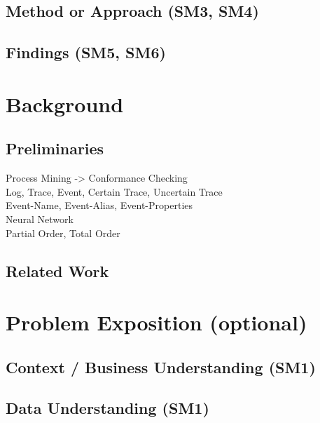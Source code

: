 \documentclass[
	a4paper,
	pagesize,
	pdftex,
	12pt,
	ngerman,
	fleqn,
	final,
	]{scrartcl}
\theoremstyle{definition}
\begin{document}
	\subsection{Method or Approach (SM3, SM4)}\label{sec:introduction::method}
	
	\subsection{Findings (SM5, SM6)}\label{sec:introduction::results}

\section{Background}
	\subsection{Preliminaries}
		Process Mining -> Conformance Checking \\
		Log, Trace, Event, Certain Trace, Uncertain Trace \\
		Event-Name, Event-Alias, Event-Properties \\
		Neural Network \\
		Partial Order, Total Order \\ 
	\subsection{Related Work}
	\cite{de2018aligning}
	\cite{lu2014conformance}
	\cite{lu2014conformanceShort}
	\cite{self}
	\cite{tax2017predictive}
\section{Problem Exposition (optional)}
	
	\subsection{Context / Business Understanding (SM1)}
	
	\subsection{Data Understanding (SM1)}
	
\end{document}
